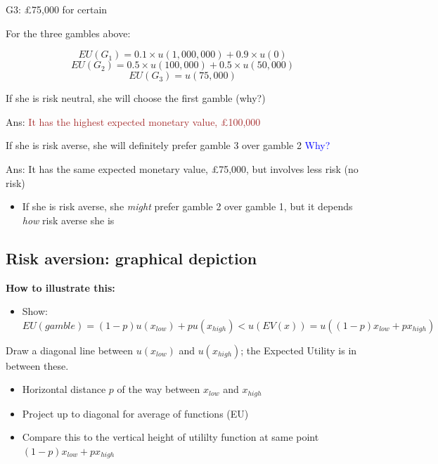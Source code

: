 \documentclass[]{article}
\providecommand{\tightlist}{%
  \setlength{\itemsep}{0pt}\setlength{\parskip}{0pt}}
\begin{document}
G3: \pounds75,000 for certain

\bigskip

For the three gambles above:

\[EU(G_1)=0.1 \times u(1,000,000) + 0.9 \times u(0)\]
\[EU(G_2)= 0.5 \times u(100,000) + 0.5 \times u(50,000)\]
\[EU(G_3)= u(75,000)\]

\bigskip

If she is risk neutral, she will choose the first gamble (why?)

Ans: \textcolor{brown}{It has the highest expected monetary value, \pounds100,000}

\bigskip

If she is risk averse, she will definitely prefer gamble 3 over gamble 2 \textcolor{blue}{Why?}

Ans: It has the same expected monetary value, £75,000, but involves less risk (no risk)

\bigskip

\begin{itemize}
\tightlist
\item
  If she is risk averse, she \emph{might} prefer gamble 2 over gamble 1, but it depends \emph{how} risk averse she is
\end{itemize}

\hypertarget{risk-aversion-graphical-depiction}{%
\subsection{Risk aversion: graphical depiction}\label{risk-aversion-graphical-depiction}}

\textbf{How to illustrate this:}

\begin{itemize}
\tightlist
\item
  Show: \(EU(gamble) = (1-p)u(x_{low}) + pu(x_{high}) < u(EV(x)) = u((1-p)x_{low} + px_{high})\)
\end{itemize}

Draw a diagonal line between \(u(x_{low})\) and \(u(x_{high})\); the Expected Utility is in between these.

\begin{itemize}
\item
  Horizontal distance \(p\) of the way between \(x_{low}\) and \(x_{high}\)
\item
  Project up to diagonal for average of functions (EU)
\item
  Compare this to the vertical height of utililty function at same point \((1-p)x_{low} + px_{high}\)
\end{itemize}
\end{document}
